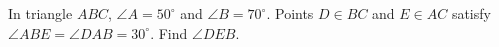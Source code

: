 In triangle $ABC$, $\angle A=50^\circ$ and $\angle B=70^\circ$. Points $D\in BC$ and $E\in AC$ satisfy $\angle ABE=\angle DAB=30^\circ$. Find $\angle DEB$.

